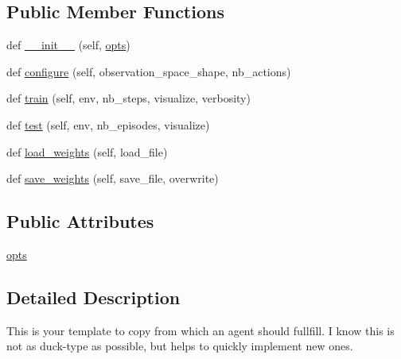 \subsection*{Public Member Functions}
\begin{DoxyCompactItemize}
\item 
def \hyperlink{classpybullet-gym_1_1pybulletgym_1_1agents_1_1agents__kerasrl_1_1_template_agent_a7e7c3d7879ca89d3d495a2d258ebd476}{\+\_\+\+\_\+init\+\_\+\+\_\+} (self, \hyperlink{classpybullet-gym_1_1pybulletgym_1_1agents_1_1agents__kerasrl_1_1_template_agent_a73a48cf9262f9a70482bcca3d490b762}{opts})
\item 
def \hyperlink{classpybullet-gym_1_1pybulletgym_1_1agents_1_1agents__kerasrl_1_1_template_agent_af576c61c93da8107ba5e0a7f3ea58a3f}{configure} (self, observation\+\_\+space\+\_\+shape, nb\+\_\+actions)
\item 
def \hyperlink{classpybullet-gym_1_1pybulletgym_1_1agents_1_1agents__kerasrl_1_1_template_agent_a3421ecac9cf6e6f7000c3e686b3cf3fe}{train} (self, env, nb\+\_\+steps, visualize, verbosity)
\item 
def \hyperlink{classpybullet-gym_1_1pybulletgym_1_1agents_1_1agents__kerasrl_1_1_template_agent_accfa04acee30d0db75ace55176d23383}{test} (self, env, nb\+\_\+episodes, visualize)
\item 
def \hyperlink{classpybullet-gym_1_1pybulletgym_1_1agents_1_1agents__kerasrl_1_1_template_agent_a1434f29f4bf75ead80b275b8636e6a1c}{load\+\_\+weights} (self, load\+\_\+file)
\item 
def \hyperlink{classpybullet-gym_1_1pybulletgym_1_1agents_1_1agents__kerasrl_1_1_template_agent_a461dca7061b996d67bbe4f904cd49af6}{save\+\_\+weights} (self, save\+\_\+file, overwrite)
\end{DoxyCompactItemize}
\subsection*{Public Attributes}
\begin{DoxyCompactItemize}
\item 
\hyperlink{classpybullet-gym_1_1pybulletgym_1_1agents_1_1agents__kerasrl_1_1_template_agent_a73a48cf9262f9a70482bcca3d490b762}{opts}
\end{DoxyCompactItemize}


\subsection{Detailed Description}
\begin{DoxyVerb}This is your template to copy from which an agent should fullfill. I know this is not as duck-type as possible, but helps to quickly implement new ones.
\end{DoxyVerb}
 

